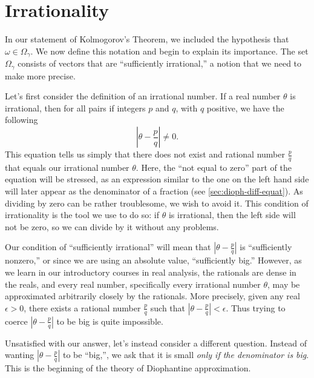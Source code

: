 \documentclass[twoside,letterpaper,10pt]{article}
\numberwithin{equation}{section}
\begin{document}

\section{Irrationality}
\label{sec:irrationality}

In our statement of Kolmogorov's Theorem, we included the hypothesis that
$\omega \in \Omega_{\gamma}$.
We now define this notation and begin to explain its importance.
The set $\Omega_{\gamma}$ consists of vectors that are ``sufficiently
irrational,'' a notion that we need to make more precise.

Let's first consider the definition of an irrational number.
If a real number $\theta$ is irrational, then for all pairs if integers $p$ and
$q$, with $q$ positive, we have the following
\begin{equation*}
  \left| \theta - \frac{p}{q} \right| \neq 0.
\end{equation*}
This equation tells us simply that there does not exist and rational number
$\frac{p}{q}$ that equals our irrational number $\theta$.
Here, the ``not equal to zero'' part of the equation will be stressed, as an
expression similar to the one on the left hand side will later appear as the
denominator of a fraction (see \cref{sec:dioph-diff-equat}).
As dividing by zero can be rather troublesome, we wish to avoid it.
This condition of irrationality is the tool we use to do so: if $\theta$ is
irrational, then the left side will not be zero, so we can divide by it without
any problems.

Our condition of ``sufficiently irrational'' will mean that $\left| \theta -
  \frac{p}{q} \right|$ is ``sufficiently nonzero,'' or since we are using an
absolute value, ``sufficiently big.''
However, as we learn in our introductory courses in real analysis, the rationals
are dense in the reals, and every real number, specifically every irrational
number $\theta$, may be approximated arbitrarily closely by the rationals.
More precisely, given any real $\epsilon > 0$, there exists a rational number
$\frac{p}{q}$ such that $\left| \theta - \frac{p}{q} \right| < \epsilon$.
Thus trying to coerce $\left| \theta - \frac{p}{q} \right|$ to be big is quite
impossible.

Unsatisfied with our answer, let's instead consider a different question.
Instead of wanting $\left| \theta - \frac{p}{q} \right|$ to be ``big,'', we ask
that it is small \emph{only if the denominator is big}.
This is the beginning of the theory of Diophantine approximation.
\end{document}
